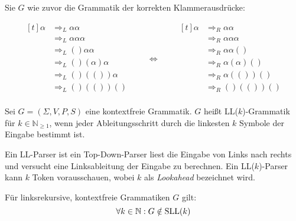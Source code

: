 \begin{beispiel}
    Sie $G$ wie zuvor die Grammatik der korrekten Klammerausdrücke:

    \begin{equation*}
    \begin{aligned}[t]
        \alpha &\Rightarrow_L \alpha \alpha\\
               &\Rightarrow_L \alpha \alpha \alpha\\
               &\Rightarrow_L () \alpha \alpha\\
               &\Rightarrow_L () (\alpha) \alpha\\
               &\Rightarrow_L () (()) \alpha\\
               &\Rightarrow_L () (()) ()\\
    \end{aligned}
    \qquad\Longleftrightarrow\qquad
    \begin{aligned}[t]
        \alpha &\Rightarrow_R \alpha \alpha\\
               &\Rightarrow_R \alpha \alpha \alpha\\
               &\Rightarrow_R \alpha \alpha ()\\
               &\Rightarrow_R \alpha (\alpha) ()\\
               &\Rightarrow_R \alpha (()) ()\\
               &\Rightarrow_R () (()) ()\\
    \end{aligned}
    \end{equation*}
\end{beispiel}

\begin{definition}[LL($k$)-Grammatik]%
    Sei $G = (\Sigma, V, P, S)$ eine kontextfreie Grammatik. $G$ heißt
    LL($k$)-Grammatik für $k \in \mathbb{N}_{\geq 1}$, wenn jeder Ableitungsschritt durch
    die linkesten $k$ Symbole der Eingabe bestimmt ist.
\end{definition}

Ein LL-Parser ist ein Top-Down-Parser liest die Eingabe von Links nach rechts
und versucht eine Linksableitung der Eingabe zu berechnen. Ein LL($k$)-Parser
kann $k$ Token vorausschauen, wobei $k$ als \textit{Lookahead}
bezeichnet wird.

\begin{satz}
    Für linksrekursive, kontextfreie Grammatiken $G$ gilt:
    \[\forall k \in \mathbb{N}: G \notin \operatorname{SLL}(k)\]
\end{satz}